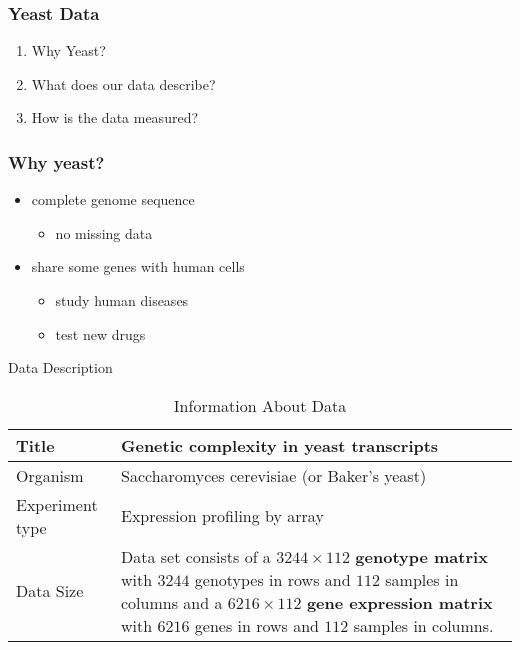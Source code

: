 \begin{frame}\frametitle{Yeast Data}
    \begin{enumerate}
        \item Why Yeast?
        \item What does our data describe?
        \item How is the data measured? 
    \end{enumerate}
\end{frame}

\begin{frame}\frametitle{Why yeast?}
    \begin{itemize}
    	\item complete genome sequence  
		\begin{itemize}
			\item no missing data 
		\end{itemize}    	
		\item share some genes with human cells   
		\begin{itemize}
			\item study human diseases
			\item test new drugs
		\end{itemize}		     

        
    \end{itemize}
\end{frame}

\begin{frame}{Data Description}
\begin{table}[h]
        \centering
        \begin{tabular}{|l|p{7cm}|}
            \hline
            Title                           &   Genetic complexity in yeast transcripts \\ \hline
            Organism                        &   Saccharomyces cerevisiae (or Baker's yeast)                \\ \hline
            Experiment type                 &   Expression profiling by array           \\ \hline
            \multirow{4}{*}{Data Size}      &   Data set consists of a $3244\times112$ \textbf{genotype matrix} with $3244$ genotypes in rows and $112$ samples in columns and a $6216\times112$ \textbf{gene expression matrix} with $6216$ genes in rows and $112$ samples in columns.  \\ \hline
        \end{tabular}
        \caption{Information About Data}
    \end{table}
\end{frame}

